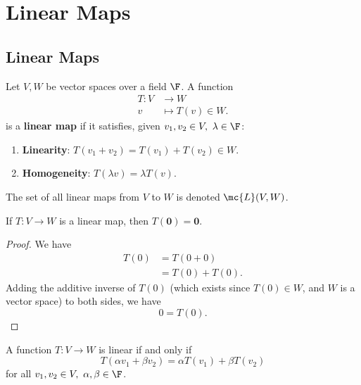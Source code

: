 \documentclass[math0540-lecture-notes.tex]{subfiles}
\begin{document}
\chapter{Linear Maps}

\section{Linear Maps}
\begin{definition}{}
  Let $V,W$ be vector spaces over a field $\F$. A function \begin{align*}
    T: V &\longrightarrow W \\
    v &\longmapsto T(v) \in W
  .\end{align*} is a \textbf{linear map}
  if it satisfies, given $v_1,v_2\in V,\ \lambda\in \F$:
  \begin{enumerate}
    \item \textbf{Linearity}: $T(v_1+v_2) = T(v_1)+T(v_2)\in W$.
    \item \textbf{Homogeneity}: $T(\lambda v)=\lambda T(v)$.
  \end{enumerate}
\end{definition}

The set of all linear maps from $V$ to $W$ is denoted $\mc{L}(V,W)$.

\begin{proposition}{}
  If $T:V\to W$ is a linear map, then $T(\textbf{0})=\textbf{0}$.
\end{proposition}
\begin{proof}[Proof]
  We have
  \begin{align*}
    T(0) &= T(0+0) \\
         &= T(0)+T(0)
         .\end{align*} Adding the additive inverse of $T(0)$ (which exists since $T(0)\in W$, and
         $W$ is a vector space) to both sides, we have  \[
       0 = T(0)
       .\] 
\end{proof}

\begin{proposition}{}
  A function $T:V\to W$ is linear if and only if \[
    T(\alpha v_1 + \beta v_2) = \alpha T(v_1) + \beta T(v_2)
  \]  for all $ v_1,v_2\in V,\ \alpha,\beta\in \F$.
\end{proposition}
\end{document}
